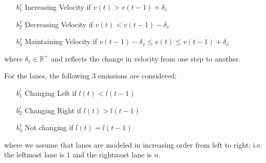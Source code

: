 \documentclass[letterpaper, 10 pt, conference]{ieeeconf}  %
\newcommand\NB[1]{$\spadesuit$\footnote{NB: #1}}
\newcommand\RP[1]{$\clubsuit$\footnote{RP: #1}}
\begin{document}

\begin{itemize}
    \item[$b_1^v$] {Increasing Velocity if $v(t) > v(t-1)+\delta_v$} 
    \item[$b_2^v$] {Decreasing Velocity if $v(t) < v(t-1)-\delta_v$}
    \item[$b_3^v$] {Maintaining Velocity if $v(t-1)-\delta_v \leq v(t) \leq v(t-1)+\delta_v$}
\end{itemize}
where $\delta_v\in\mathbb{R}^+$ and reflects the change in velocity from one step to another.

For the lanes, the following 3 emissions are considered:

\begin{enumerate}
    \item[$b_1^l$] Changing Left if $l(t) < l(t-1)$
    \item[$b_2^l$] Changing Right if $l(t) > l(t-1)$
    \item[$b_3^1$] Not changing if  $l(t) = l(t-1)$
\end{enumerate}
where we assume that lanes are modeled in increasing order from left to right; i.e. the leftmost lane is $1$ and the rightmost lane is $n$.
\end{document}
